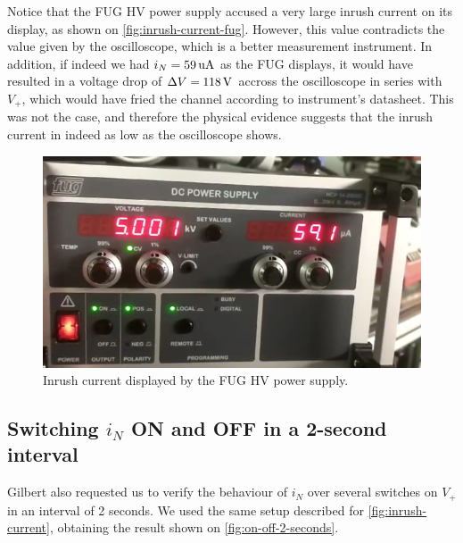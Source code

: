 \documentclass[oneside,12pt]{article}
\begin{document}
Notice that the FUG HV power supply accused a very large inrush current on its display, as shown on \autoref{fig:inrush-current-fug}.
However, this value contradicts the value given by the oscilloscope, which is a better measurement instrument. In addition, if
indeed we had $i_N = 59 \,\mathrm{uA}$ as the FUG displays, it would have resulted in a voltage drop of $\Delta V = 118 \,\mathrm{V}$ accross the 
oscilloscope in series with $V_+$, which would have fried the channel according to instrument's datasheet. This was not the case, 
and therefore the physical evidence suggests that the inrush current in indeed as low as the oscilloscope shows. 

\begin{figure}[h!]
    \centering
    \includegraphics[width=\textwidth,trim=1 1 1 1,clip]{figures/inrush-current-fug.png}
    \caption{Inrush current displayed by the FUG HV power supply.}
    \label{fig:inrush-current-fug}
\end{figure}

\subsection{Switching $i_N$ ON and OFF in a 2-second interval}

Gilbert also requested us to verify the behaviour of $i_N$ over several switches on $V_+$ in an interval of 2 seconds. We used the same 
setup described for \autoref{fig:inrush-current}, obtaining the result shown on \autoref{fig:on-off-2-seconds}.
\end{document}
